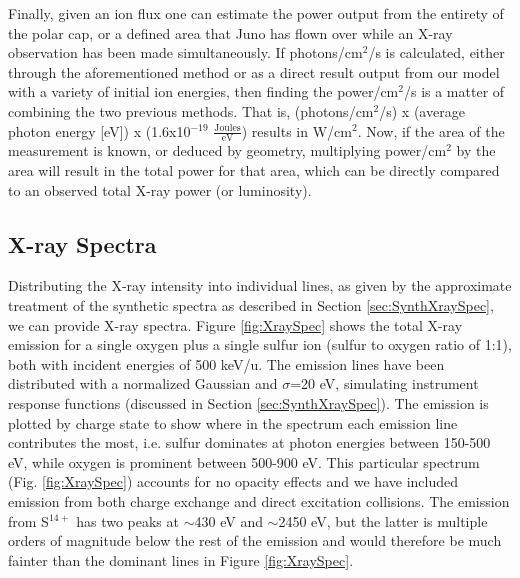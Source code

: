 \documentclass[draft]{agujournal2018}
\begin{document}
Finally, given an ion flux one can estimate the power output from the entirety of the polar cap, or a defined area that Juno has flown over while an X-ray observation has been made simultaneously.
If photons/cm$^2$/s is calculated, either through the aforementioned method or as a direct result output from our model with a variety of initial ion energies, then finding the power/cm$^2$/s is a matter of combining the two  previous methods.
That is, (photons/cm$^2$/s) x (average photon energy [eV]) x (1.6x10$^{-19}$ $\frac{\mathrm{Joules}}{\mathrm{eV}}$) results in W/cm$^2$.
Now, if the area of the measurement is known, or deduced by geometry, multiplying power/cm$^2$ by the area will result in the total power for that area, which can be directly compared to an observed total X-ray power (or luminosity).

\subsection{X-ray Spectra}
\label{sec:XraySpec}

Distributing the X-ray intensity into individual lines, as given by the approximate treatment of the synthetic spectra as described in Section \ref{sec:SynthXraySpec}, we can provide X-ray spectra.
Figure \ref{fig:XraySpec} shows the total X-ray emission for a single oxygen plus a single sulfur ion (sulfur to oxygen ratio of 1:1), both with incident energies of 500 keV/u.
The emission lines have been distributed with a normalized Gaussian and $\sigma$=20 eV, simulating instrument response functions (discussed in Section \ref{sec:SynthXraySpec}).
The emission is plotted by charge state to show where in the spectrum each emission line contributes the most, i.e. sulfur dominates at photon energies between 150-500 eV, while oxygen is prominent between 500-900 eV.
This particular spectrum (Fig. \ref{fig:XraySpec}) accounts for no opacity effects and we have included emission from both charge exchange and direct excitation collisions.
The emission from S$^{14+}$ has two peaks at $\sim$430 eV and $\sim$2450 eV, but the latter is multiple orders of magnitude below the rest of the emission and would therefore be much fainter than the dominant lines in Figure \ref{fig:XraySpec}.
\end{document}
